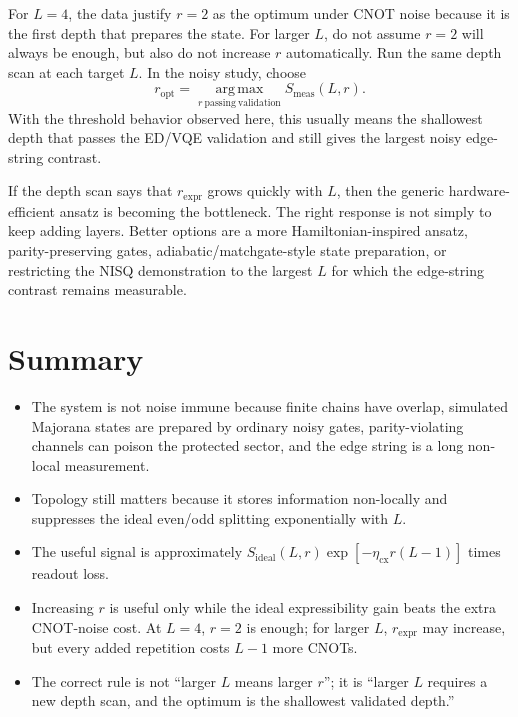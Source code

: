 \documentclass[11pt]{article}
\begin{document}
For $L=4$, the data justify $r=2$ as the optimum under CNOT noise because it is
the first depth that prepares the state. For larger $L$, do not assume $r=2$ will
always be enough, but also do not increase $r$ automatically. Run the same depth
scan at each target $L$. In the noisy study, choose
\begin{equation}
  r_{\mathrm{opt}}
  =
  \operatorname*{arg\,max}_{r\ \mathrm{passing\ validation}}
  S_{\mathrm{meas}}(L,r).
\end{equation}
With the threshold behavior observed here, this usually means the shallowest
depth that passes the ED/VQE validation and still gives the largest noisy
edge-string contrast.

If the depth scan says that $r_{\mathrm{expr}}$ grows quickly with $L$, then the
generic hardware-efficient ansatz is becoming the bottleneck. The right response
is not simply to keep adding layers. Better options are a more
Hamiltonian-inspired ansatz, parity-preserving gates, adiabatic/matchgate-style
state preparation, or restricting the NISQ demonstration to the largest $L$ for
which the edge-string contrast remains measurable.

\section{Summary}

\begin{itemize}
  \item The system is not noise immune because finite chains have overlap,
  simulated Majorana states are prepared by ordinary noisy gates, parity-violating
  channels can poison the protected sector, and the edge string is a long
  non-local measurement.
  \item Topology still matters because it stores information non-locally and
  suppresses the ideal even/odd splitting exponentially with $L$.
  \item The useful signal is approximately
  $S_{\mathrm{ideal}}(L,r)\exp[-\eta_{\mathrm{cx}}r(L-1)]$ times readout loss.
  \item Increasing $r$ is useful only while the ideal expressibility gain beats
  the extra CNOT-noise cost. At $L=4$, $r=2$ is enough; for larger $L$,
  $r_{\mathrm{expr}}$ may increase, but every added repetition costs $L-1$ more
  CNOTs.
  \item The correct rule is not ``larger $L$ means larger $r$''; it is ``larger
  $L$ requires a new depth scan, and the optimum is the shallowest validated
  depth.''
\end{itemize}
\end{document}

